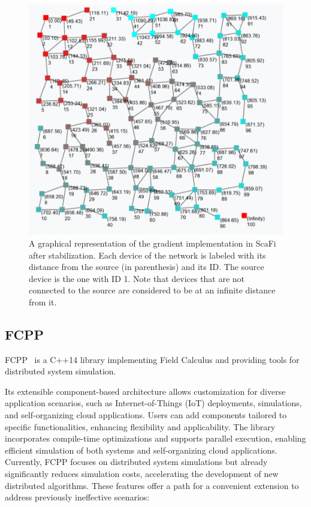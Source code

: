 \begin{figure}
    \centering
    \includegraphics[width=\linewidth]{figures/scafi-gradient.png}
    \caption{A graphical representation of the gradient implementation in ScaFi after stabilization. Each device of the network is labeled with its distance from the source (in parenthesis) and its ID. The source device is the one with ID 1. Note that devices that are not connected to the source are considered to be at an infinite distance from it.}
    \label{fig:scafi-gradient}
\end{figure}

\subsection{FCPP}

FCPP~\cite{Audrito2020} is a C++14 library implementing Field Calculus and providing tools for distributed system simulation.

Its extensible component-based architecture allows customization for diverse application scenarios, such as Internet-of-Things (IoT) deployments, simulations, and self-organizing cloud applications. Users can add components tailored to specific functionalities, enhancing flexibility and applicability. The library incorporates compile-time optimizations and supports parallel execution, enabling efficient simulation of both systems and self-organizing cloud applications. Currently, FCPP focuses on distributed system simulations but already significantly reduces simulation costs, accelerating the development of new distributed algorithms. These features offer a path for a convenient extension to address previously ineffective scenarios:

